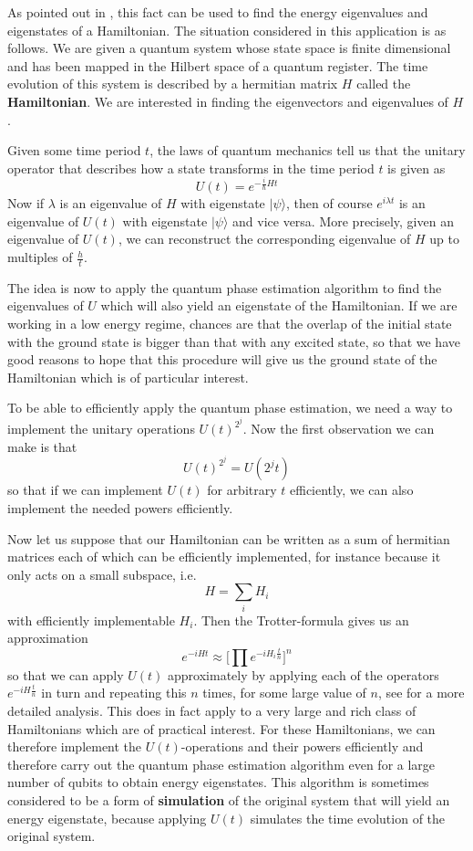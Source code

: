 \documentclass[a4paper, draft]{article}
\theoremstyle{own}
\theoremstyle{remark}
\begin{document}
As pointed out in \cite{AbramsLloyd}, this fact can be used to find the energy eigenvalues and eigenstates of a Hamiltonian. The situation considered in this application is as follows. We are given a quantum system whose state space is finite dimensional and has been mapped in the Hilbert space of a quantum register. The time evolution of this system is described by a hermitian matrix $H$ called the {\bf Hamiltonian}. We are interested in finding the eigenvectors and eigenvalues of $H$.

Given some time period $t$, the laws of quantum mechanics tell us that the unitary operator that describes how a state transforms in the time period $t$ is given as
$$
U(t) = e^{-\frac{i}{\hbar}Ht}
$$
Now if $\lambda$ is an eigenvalue of $H$ with eigenstate $|\psi \rangle$, then of course $e^{i\lambda t}$ is an eigenvalue of $U(t)$ with eigenstate $|\psi \rangle$ and vice versa. More precisely, given an eigenvalue of $U(t)$, we can reconstruct the corresponding eigenvalue of $H$ up to multiples of $\frac{h}{t}$. 

The idea is now to apply the quantum phase estimation algorithm to find the eigenvalues of $U$ which will also yield an eigenstate of the Hamiltonian. If we are working in a low energy regime, chances are that the overlap of the initial state with the ground state is bigger than that with any excited state, so that we have good reasons to hope that this procedure will give us the ground state of the Hamiltonian which is of particular interest.

To be able to efficiently apply the quantum phase estimation, we need a way to implement the unitary operations $U(t)^{2^j}$. Now the first observation we can make is that
$$
U(t)^{2^j} = U(2^j t)
$$
so that if we can implement $U(t)$ for arbitrary $t$ efficiently, we can also implement the needed powers efficiently. 

Now let us suppose that our Hamiltonian can be written as a sum of hermitian matrices each of which can be efficiently implemented, for instance because it only acts on a small subspace, i.e.
$$
H = \sum_i H_i
$$
with efficiently implementable $H_i$. Then the Trotter-formula gives us an approximation
$$
e^{-iHt} \approx \big[ \prod e^{-iH_i \frac{t}{n}} \big]^n
$$
so that we can apply $U(t)$ approximately by applying each of the operators $e^{-iH\frac{t}{n}}$ in turn and repeating this $n$ times, for some large value of $n$, see \cite{Lloyd} for a more detailed analysis. This does in fact apply to a very large and rich class of Hamiltonians which are of practical interest. For these Hamiltonians, we can therefore implement the $U(t)$-operations and their powers efficiently and therefore carry out the quantum phase estimation algorithm even for a large number of qubits to obtain energy eigenstates. This algorithm is sometimes considered to be a form of {\bf simulation} of the original system that will yield an energy eigenstate, because applying $U(t)$ simulates the time evolution of the original system. 
\end{document}
